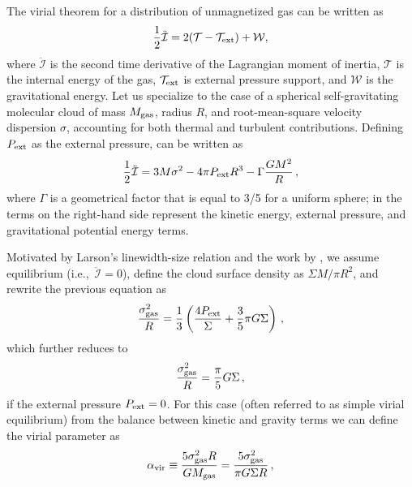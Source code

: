 \IfFileExists{emulateapjlegacy.cls}{\documentclass[iop]{emulateapjlegacy}}{\documentclass[iop]{emulateapj}}
\begin{document}
The virial theorem for a distribution of unmagnetized gas can be written as \citep{McKee92a}
\begin{equation}\label{eqn:virial_th_general}
\frac{1}{2}\ddot{\mathcal{I}} = 2(\mathcal{T} - \mathcal{T}_{\rm ext}) + \mathcal{W},
\end{equation}
where $\ddot{\mathcal{I}}$ is the second time derivative of the
Lagrangian moment of inertia, $\mathcal{T}$ is the internal energy of
the gas, $\mathcal{T}_{\rm ext}$ is external pressure support, and
$\mathcal{W}$ is the gravitational energy.
%
Let us specialize to the case of a spherical self-gravitating molecular cloud of mass $M_{\rm gas}$, radius $R$, and root-mean-square velocity dispersion $\sigma$, accounting for both thermal and turbulent contributions. Defining $P_{\rm ext}$ as the external pressure,  can be written as
\begin{equation}
\frac{1}{2}{\ddot{\mathcal{I}}} = 3 M \sigma^2 - 4\pi P_{\rm ext} R^3 - \Gamma\frac{GM^2}{R}\,,
\label{eqn:virial}
\end{equation}
where $\Gamma$ is a geometrical factor that is equal to 3/5 for a uniform sphere; in  the terms on the right-hand side represent the kinetic energy, external pressure, and gravitational potential energy terms.

Motivated by Larson's linewidth-size relation \citep{Larson81a} and the work by \citet{Heyer09a}, we assume equilibrium (i.e.,\ ${\ddot{\mathcal{I}}}=0$), define the cloud surface density as
$\Sigma$\eq$M/\pi R^2$, and rewrite the previous equation as
\begin{equation}
\frac{\sigma_{\rm gas}^2}{R} = \frac{1}{3}\left(\frac{4P_{\rm ext}}{\Sigma} + \frac{3}{5} \pi G \Sigma \right)\,,
\label{eqn:v0}
\end{equation}
which further reduces to
\begin{equation}
\frac{\sigma_{\rm gas}^2}{R} = \frac{\pi}{5} G \Sigma\,,
\label{eqn:SVE}
\end{equation}
if the external pressure $P_{\rm ext}=0$. For this case (often referred to as simple virial equilibrium) from the balance between kinetic and gravity terms we can define the virial parameter as
\begin{equation}
\alpha_{\rm vir} \equiv  \frac{5\sigma_{\rm gas}^2R}{GM_{\rm gas}} = \frac{5\sigma_{\rm gas}^2}{\pi G \Sigma R}\,,
\label{eqn:alpha}
\end{equation}
\end{document}

